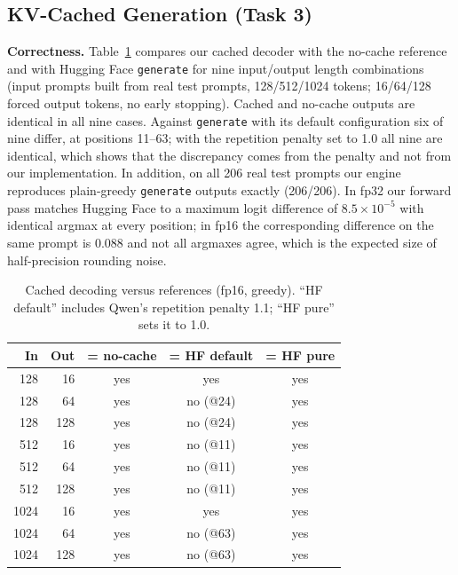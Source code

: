 \begin{table}[t]
\caption{Representative test errors, one per distinct error type (NEI = not enough information; ev. = evidence sentence IDs).}
\label{tab:errors}
\centering\scriptsize

\end{table}

\subsection{KV-Cached Generation (Task 3)}\label{sec:kv}
\textbf{Correctness.} Table~\ref{tab:equiv} compares our cached decoder with the no-cache reference and with Hugging Face \texttt{generate} for nine input/output length combinations (input prompts built from real test prompts, 128/512/1024 tokens; 16/64/128 forced output tokens, no early stopping). Cached and no-cache outputs are identical in all nine cases. Against \texttt{generate} with its default configuration six of nine differ, at positions 11--63; with the repetition penalty set to 1.0 all nine are identical, which shows that the discrepancy comes from the penalty and not from our implementation. In addition, on all 206 real test prompts our engine reproduces plain-greedy \texttt{generate} outputs exactly (206/206). In fp32 our forward pass matches Hugging Face to a maximum logit difference of $8.5\times10^{-5}$ with identical argmax at every position; in fp16 the corresponding difference on the same prompt is 0.088 and not all argmaxes agree, which is the expected size of half-precision rounding noise.

\begin{table}[t]
\caption{Cached decoding versus references (fp16, greedy). ``HF default'' includes Qwen's repetition penalty 1.1; ``HF pure'' sets it to 1.0.}
\label{tab:equiv}
\centering\scriptsize
\begin{tabular}{rrccc}\toprule In & Out & = no-cache & = HF default & = HF pure\\\midrule
128 & 16 & yes & yes & yes\\
128 & 64 & yes & no (@24) & yes\\
128 & 128 & yes & no (@24) & yes\\
512 & 16 & yes & no (@11) & yes\\
512 & 64 & yes & no (@11) & yes\\
512 & 128 & yes & no (@11) & yes\\
1024 & 16 & yes & yes & yes\\
1024 & 64 & yes & no (@63) & yes\\
1024 & 128 & yes & no (@63) & yes\\
\bottomrule\end{tabular}
\end{table}

